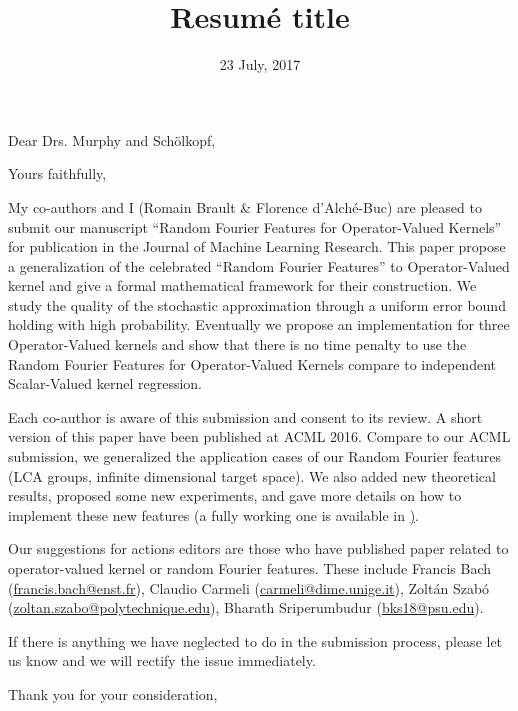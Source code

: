 \documentclass[11pt,a4paper,sans]{moderncv}        %
\title{Resum\'e title}                               %
\begin{document}
\date{23 July, 2017}
\opening{Dear Drs. Murphy and Sch\"olkopf,}
\closing{Yours faithfully,}
\makelettertitle%

My co-authors and I (Romain Brault \& Florence d'Alch\'e-Buc) are pleased to
submit our manuscript ``Random Fourier Features for Operator-Valued Kernels''
for publication in the Journal of Machine Learning Research. This paper propose
a generalization of the celebrated ``Random Fourier Features'' to
Operator-Valued kernel and give a formal mathematical framework for their
construction. We study the quality of the stochastic approximation through a
uniform error bound holding with high probability. Eventually we propose an
implementation for three Operator-Valued kernels and show that there is no time
penalty to use the Random Fourier Features for Operator-Valued Kernels compare
to independent Scalar-Valued kernel regression.

\medskip

Each co-author is aware of this submission and consent to its review. A short
version of this paper have been published at ACML 2016. Compare to our ACML
submission, we generalized the application cases of our Random Fourier features
(LCA groups, infinite dimensional target space). We also added new theoretical
results, proposed some new experiments, and gave more details on how to
implement these new features (a fully working one is available in
\href{https://github.com/operalib/operalib}).

\medskip

Our suggestions for actions editors are those who have published
paper related to operator-valued kernel or random Fourier features. These
include Francis Bach (\href{mailto:francis.bach@ens.fr}{francis.bach@enst.fr}),
Claudio Carmeli (\href{mailto:carmeli@dime.unige.it}{carmeli@dime.unige.it}),
Zolt\'an Szab\'o
(\href{mailto:zoltan.szabo@polytechnique.edu}{zoltan.szabo@polytechnique.edu}),
Bharath Sriperumbudur (\href{mailto:bks18@psu.edu}{bks18@psu.edu}).

\medskip

If there is anything we have neglected to do in the submission process, please
let us know and we will rectify the issue immediately.

\medskip

Thank you for your consideration,

\makeletterclosing%
\end{document}
